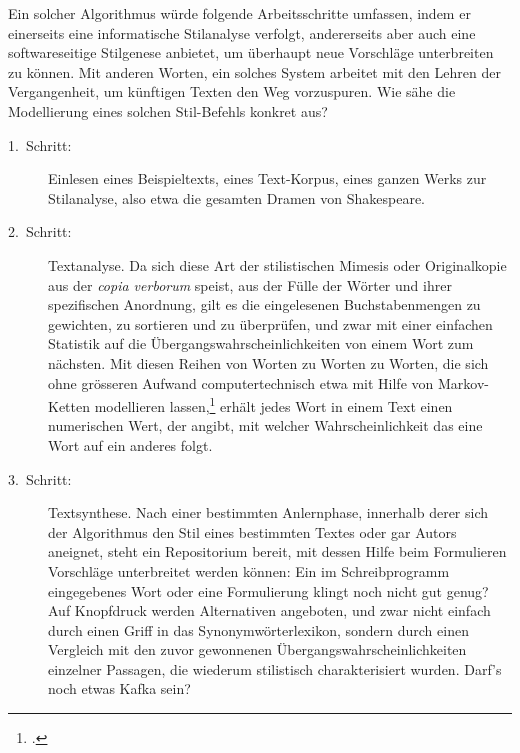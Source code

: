 \documentclass[a4paper,11pt]{article}
\newcommand{\ueber}[1]{{\color{crimson}[#1]}}
\begin{document}
Ein solcher Algorithmus würde folgende Arbeitsschritte umfassen, indem er einerseits eine informatische Stilanalyse verfolgt, andererseits aber auch eine softwareseitige Stilgenese anbietet, um überhaupt neue Vorschläge unterbreiten zu können. Mit anderen Worten, ein solches System arbeitet mit den Lehren der Vergangenheit, um künftigen Texten den Weg vorzuspuren. Wie sähe die Modellierung eines solchen Stil-Befehls konkret aus?

\begin{description}
\item[1.~Schritt:] Einlesen eines Beispieltexts, eines Text-Korpus, eines ganzen Werks zur Stilanalyse, also etwa die gesamten Dramen von Shakespeare.
\item[2.~Schritt:] Textanalyse. Da sich diese Art der stilistischen Mimesis oder Originalkopie aus der \emph{copia verborum} speist, aus der Fülle der Wörter und ihrer spezifischen Anordnung, gilt es die eingelesenen Buchstabenmengen zu gewichten, zu sortieren und zu überprüfen, und zwar mit einer einfachen Statistik auf die Übergangswahrscheinlichkeiten von einem Wort zum nächsten. Mit diesen Reihen von Worten zu Worten zu Worten, die sich ohne grösseren Aufwand computertechnisch etwa mit Hilfe von Markov-Ketten modellieren lassen,\footcite[Zur Geschichte dieses Algorithmus vgl.][]{hilgers:2007} erhält jedes Wort in einem Text einen numerischen Wert, der angibt, mit welcher Wahrscheinlichkeit das eine Wort auf ein anderes folgt. 
%
\item[3.~Schritt:] Textsynthese. Nach einer bestimmten Anlernphase, innerhalb derer sich der Algorithmus den Stil eines bestimmten Textes oder gar Autors aneignet, steht ein Repositorium bereit, mit dessen Hilfe beim Formulieren Vorschläge unterbreitet werden können: Ein im Schreibprogramm eingegebenes Wort oder eine Formulierung klingt noch nicht gut genug? Auf Knopfdruck werden Alternativen angeboten, und zwar nicht einfach durch einen Griff in das Synonymwörterlexikon, sondern durch einen Vergleich mit den zuvor gewonnenen Übergangswahrscheinlichkeiten einzelner Passagen, die wiederum stilistisch charakterisiert wurden. Darf's noch etwas Kafka sein? %
\end{description}
\end{document}
